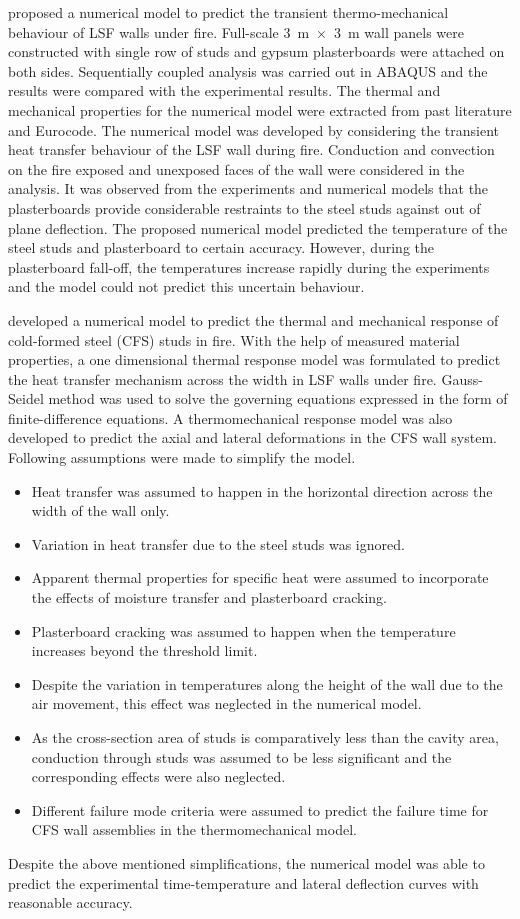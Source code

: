 \citet{Nassif2014a} proposed a numerical model to predict the transient thermo-mechanical behaviour of LSF walls under fire. Full-scale 3~m~$\times$~3~m wall panels were constructed with single row of studs and gypsum plasterboards were attached on both sides. Sequentially coupled analysis was carried out in ABAQUS and the results were compared with the experimental results. The thermal and mechanical properties for the numerical model were extracted from past literature and Eurocode. The numerical model was developed by considering the transient heat transfer behaviour of the LSF wall during fire. Conduction and convection on the fire exposed and unexposed faces of the wall were considered in the analysis. It was observed from the experiments and numerical models that the plasterboards provide considerable restraints to the steel studs against out of plane deflection. The proposed numerical model predicted the temperature of the steel studs and plasterboard to certain accuracy. However, during the plasterboard fall-off, the temperatures increase rapidly during the experiments and the model could not predict this uncertain behaviour. 

\citet{Chen2014} developed a numerical model to predict the thermal and mechanical response of cold-formed steel (CFS) studs in fire. With the help of measured material properties, a one dimensional thermal response model was formulated to predict the heat transfer mechanism across the width in LSF walls under fire. Gauss-Seidel method was used to solve the governing equations expressed in the form of finite-difference equations. A thermomechanical response model was also developed to predict the axial and lateral deformations in the CFS wall system. Following assumptions were made to simplify the model.
\begin{itemize}
	\item Heat transfer was assumed to happen in the horizontal direction across the width of the wall only. 
	\item Variation in heat transfer due to the steel studs was ignored.
	\item Apparent thermal properties for specific heat were assumed to incorporate the effects of moisture transfer and plasterboard cracking.
	\item Plasterboard cracking was assumed to happen when the temperature increases beyond the threshold limit.
	\item Despite the variation in temperatures along the height of the wall due to the air movement, this effect was neglected in the numerical model.
	\item As the cross-section area of studs is comparatively less than the cavity area, conduction through studs was assumed to be less significant and the corresponding effects were also neglected.
	\item Different failure mode criteria were assumed to predict the failure time for CFS wall assemblies in the thermomechanical model.    
\end{itemize}
Despite the above mentioned simplifications, the numerical model was able to predict the experimental time-temperature and lateral deflection curves with reasonable accuracy. 

